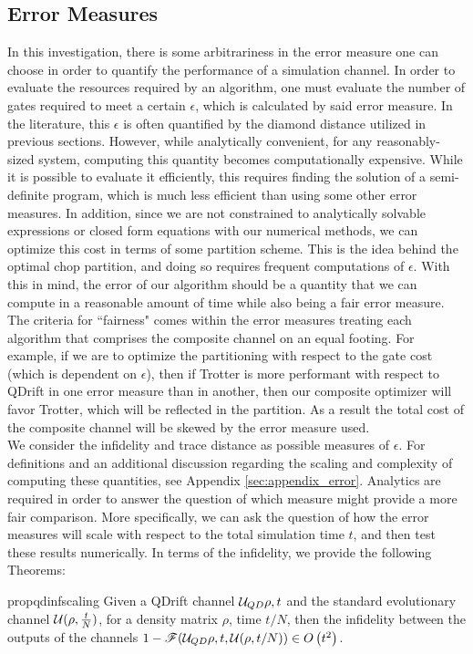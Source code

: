 \subsection{Error Measures} \label{sec:Error_Measure}
In this investigation, there is some arbitrariness in the error measure one can choose in order to quantify the performance of a simulation channel. In order to evaluate the resources required by an algorithm, one must evaluate the number of gates required to meet a certain $\epsilon$, which is calculated by said error measure. In the literature, this $\epsilon$ is often quantified by the diamond distance utilized in previous sections. However, while analytically convenient, for any reasonably-sized system, computing this quantity becomes computationally expensive. While it is possible to evaluate it efficiently, this requires finding the solution of a semi-definite program, which is much less efficient than using some other error measures. In addition, since we are not constrained to analytically solvable expressions or closed form equations with our numerical methods, we can optimize this cost in terms of some partition scheme. This is the idea behind the optimal chop partition, and doing so requires frequent computations of $\epsilon$. With this in mind, the error of our algorithm should be a quantity that we can compute in a reasonable amount of time while also being a fair error measure. The criteria for ``fairness" comes within the error measures treating each algorithm that comprises the composite channel on an equal footing. For example, if we are to optimize the partitioning with respect to the gate cost (which is dependent on $\epsilon$), then if Trotter is more performant with respect to QDrift in one error measure than in another, then our composite optimizer will favor Trotter, which will be reflected in the partition. As a result the total cost of the composite channel will be skewed by the error measure used. \\

We consider the infidelity and trace distance as possible measures of $\epsilon$. For definitions and an additional discussion regarding the scaling and complexity of computing these quantities, see Appendix \ref{sec:appendix_error}. Analytics are required in order to answer the question of which measure might provide a more fair comparison. More specifically, we can ask the question of how the error measures will scale with respect to the total simulation time $t$, and then test these results numerically. In terms of the infidelity, we provide the following Theorems:
\begin{restatable}{prop}{qdinfscaling} \label{thm:qdinfscaling}
    Given a QDrift channel $\mathcal{U}_{QD}{\rho, t}$ and the standard evolutionary channel $\mathcal{U}(\rho, \frac{t}{N})$, for a density matrix $\rho$, time $t/N$, then the infidelity between the outputs of the channels $1- \mathscr{F}(\mathcal{U}_{QD}{\rho, t}, \mathcal{U}(\rho, t/N)) \in O\left( t^2 \right)$.
 \end{restatable}

